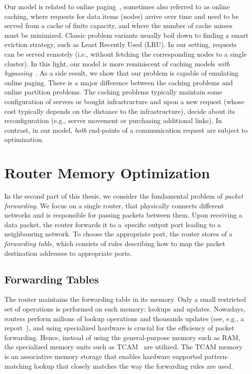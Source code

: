 Our model is related to online
paging~\cite{SleTar85,FKLMSY91,McGSle91,AcChNo00}, sometimes also referred to
as online caching, where requests for data items (nodes) arrive over time and
need to be served from a cache of finite capacity, and where the number of
cache misses must be minimized. Classic problem variants usually boil down to
finding a smart eviction strategy, such as Least Recently Used (LRU). In our
setting, requests can be served remotely (i.e., without fetching the
corresponding nodes to a single cluster). In this light, our model is more
reminiscent of caching models \emph{with
bypassing}~\cite{EpImLN11,EpImLN15,Irani02}. As a side result, we show that our problem is
capable of emulating online paging.
There is a major difference between the caching problems and online partition problems.
The caching problems typically maintain some configuration of servers or
bought infrastructure and upon a new request (whose cost typically depends on
the distance to the infrastructure), decide about its reconfiguration (e.g.,
server movement or purchasing additional links). In contrast, in our model,
\emph{both} end-points of a communication request are subject to optimization.



\section{Router Memory Optimization}
\label{sec:intro-packet-forwarding}


In the second part of this thesis, we consider the fundamental problem of \emph{packet forwarding}.
We focus on a single router, that physically connects different networks and is responsible for passing packets between them.
Upon receiving a data packet, the router forwards it to a~specific output port leading to a neighbouring network.
To choose the appropriate port, the router stores of a \emph{forwarding table}, which consists of rules describing how to map the packet destination addresses to appropriate ports.

\subsection{Forwarding Tables}

The router maintains the forwarding table in its memory.
Only a small restricted set of operations is performed on such memory: lookups and updates.
Nowadays, routers perform milions of lookup operations and thousands updates (see, e.g., a report~\cite{bgp-updates}), and using specialized hardware is crucial for the efficiency of packet forwarding.
Hence, instead of using the general-purpose memory such as RAM, the specialized memory units such as TCAM~\cite{tcam-memory} are utilized.
The TCAM memory is an associative memory storage that enables hardware supported pattern-matching lookup that closely matches the way the forwarding rules are used.

